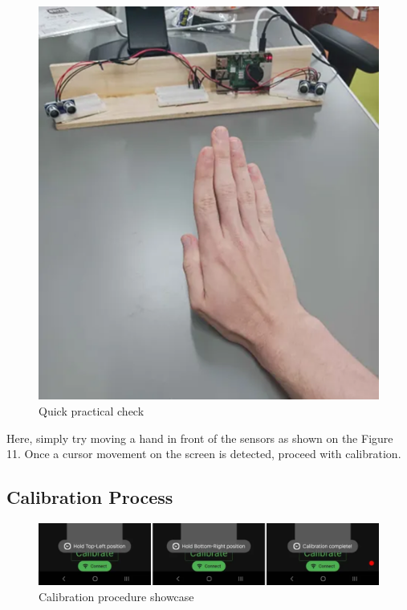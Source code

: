 \documentclass[12pt,a4paper]{article}
\begin{document}
\begin{figure}[htbp]
    \centering
    \includegraphics[scale=0.7]{../IoT Materials/article images/10-Using-hand-for-calibration.png}
    \caption{Quick practical check}
\end{figure}

Here, simply try moving a hand in front of the sensors as shown on the Figure 11. Once a cursor movement on the screen is detected, proceed with calibration.

\subsection{Calibration Process}

\begin{figure}[htbp]
    \centering
    \includegraphics[scale=0.4]{../IoT Materials/article images/11-Screen-showcase-calibration-procedure.png}
    \caption{Calibration procedure showcase}
\end{figure}
\end{document}
